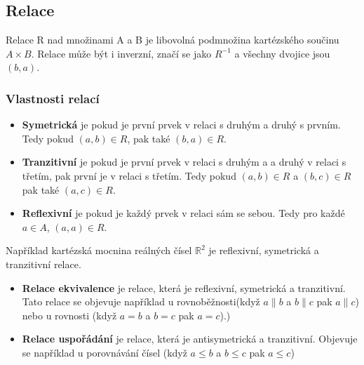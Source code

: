 \documentclass[12pt]{article}
\begin{document}
\subsection*{Relace}
Relace R nad množinami A a B je libovolná podmnožina kartézského součinu $A \times B $. Relace může být i inverzní, značí se jako $R^{-1}$ a všechny dvojice jsou $(b, a)$.

\subsubsection*{Vlastnosti relací}
\begin{itemize}[itemsep = 2pt]
    \item \textbf{Symetrická} je pokud je první prvek v relaci s druhým a druhý s prvním. Tedy pokud $(a, b) \in R$, pak také $(b, a) \in R$.
    \item \textbf{Tranzitivní} je pokud je první prvek v relaci s druhým a a druhý v relaci s třetím, pak první je v relaci s třetím. Tedy pokud $(a,b) \in R$ a $(b,c) \in R$ pak také $(a,c) \in R$. 
    \item \textbf{Reflexivní} je pokud je každý prvek v relaci sám se sebou. Tedy pro každé $a \in A$, $(a, a) \in R$.
\end{itemize}
Například kartézská mocnina reálných čísel $\mathbb{R}^2$ je reflexivní, symetrická a tranzitivní relace. 
\begin{itemize}[itemsep = 2pt]
    \item \textbf{Relace ekvivalence} je relace, která je reflexivní, symetrická a tranzitivní. Tato relace se objevuje například u rovnoběžnosti(když $a \parallel b$ a $b \parallel c$ pak $a \parallel c$) nebo u rovnosti (když $a = b$ a $b = c$ pak $a = c$).)
    \item \textbf{Relace uspořádání} je relace, která je antisymetrická a tranzitivní. Objevuje se například u porovnávání čísel (když $a \leq b$ a $b \leq c$ pak $a \leq c$)
\end{itemize}
\end{document}
